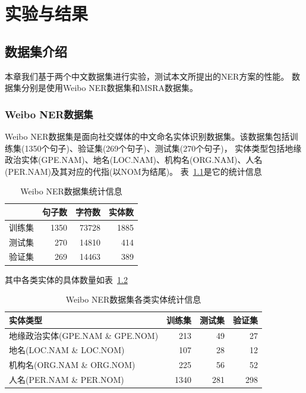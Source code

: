 
\chapter{实验与结果}

\section{数据集介绍}

本章我们基于两个中文数据集进行实验，测试本文所提出的NER方案的性能。
数据集分别是使用Weibo NER数据集\parencite{peng-dredze-2016-improving}和MSRA数据集\parencite{levow-2006-third}。

\subsection{Weibo NER数据集}
Weibo NER数据集是面向社交媒体的中文命名实体识别数据集。该数据集包括训练集(1350个句子)、验证集(269个句子)、测试集(270个句子)，
实体类型包括地缘政治实体(GPE.NAM)、地名(LOC.NAM)、机构名(ORG.NAM)、人名(PER.NAM)及其对应的代指(以NOM为结尾)。
表~\ref{tab:weibo_ner}是它的统计信息

\begin{table}[!hpt]
    \caption[Weibo NER数据集统计信息]{Weibo NER数据集统计信息}
    \label{tab:weibo_ner}
    \centering
    \begin{tabular}{lrrr} \toprule
     &  句子数 & 字符数 & 实体数 \\ \midrule
    训练集 & 1350 & 73728 & 1885 \\
    测试集 & 270 & 14810 & 414 \\
    验证集 & 269 & 14463 & 389 \\ \bottomrule
    \end{tabular}
\end{table}

其中各类实体的具体数量如表~\ref{tab:weibo_ner_entity_class}

\begin{table}[!hpt]
    \caption[Weibo NER数据集各类实体统计信息]{Weibo NER数据集各类实体统计信息}
    \label{tab:weibo_ner_entity_class}
    \centering
    \begin{tabular}{lrrr} \toprule
    实体类型 & 训练集 & 测试集 & 验证集 \\ \midrule
    地缘政治实体(GPE.NAM \& GPE.NOM) & 213 & 49 & 27 \\
    地名(LOC.NAM \& LOC.NOM) & 107 & 28 & 12 \\
    机构名(ORG.NAM \& ORG.NOM) & 225 & 56 & 52 \\
    人名(PER.NAM \& PER.NOM) & 1340 & 281 & 298 \\ \bottomrule
    \end{tabular}
\end{table}



